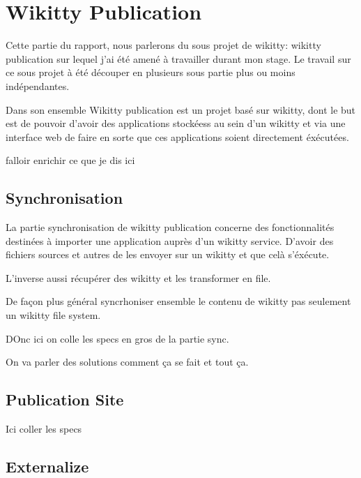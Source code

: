 \section{Wikitty Publication}

Cette partie du rapport, nous parlerons du sous projet de wikitty: wikitty
publication sur lequel j'ai été amené à travailler durant mon stage. 
Le travail sur ce sous projet à été découper en plusieurs sous partie plus ou
moins indépendantes. 

Dans son ensemble Wikitty publication est un projet basé sur wikitty, dont le
but est de pouvoir d'avoir des applications stockéess au sein d'un wikitty et
via une interface web de faire en sorte que ces applications soient directement
éxécutées. 

falloir enrichir ce que je dis ici

\subsection{Synchronisation}

La partie synchronisation de wikitty publication concerne des fonctionnalités
destinées à importer une application auprès d'un wikitty service. D'avoir des
fichiers sources et autres de les envoyer sur un wikitty et que celà s'éxécute.

L'inverse aussi récupérer des wikitty et les transformer en file.

De façon plus général syncrhoniser ensemble le contenu de wikitty pas seulement
un wikitty file system.

DOnc ici on colle les specs en gros de la partie sync.

On va parler des solutions comment ça se fait et tout ça.

\subsection{Publication Site}

Ici coller les specs



\subsection{Externalize}